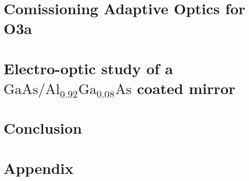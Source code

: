 \documentclass[12pt]{report}
\newcommand{\algaas}{\mathrm{Al_{0.92}Ga_{0.08}As}}
\newcommand{\gaas}{\mathrm{GaAs}}
\begin{document}
\chapter{Comissioning Adaptive Optics for O3a}

\newpage

\chapter{Electro-optic study of a \texorpdfstring{$\gaas / \algaas$}{gaas/algaas} coated mirror}

\newpage 

\chapter{Conclusion}

\newpage

\chapter{Appendix} \label{ch:appendix}




\end{document}
